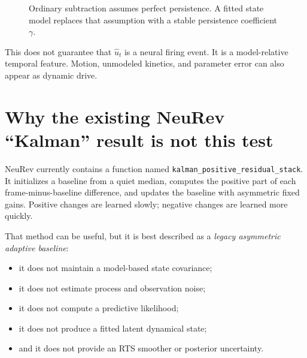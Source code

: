 \documentclass[11pt]{article}
\begin{document}
\begin{figure}[h]
\centering
{}
\caption{Ordinary subtraction assumes perfect persistence. A fitted state model
replaces that assumption with a stable persistence coefficient \(\gamma\).}
\label{fig:gamma-difference}
\end{figure}

This does not guarantee that \(\widehat u_t\) is a neural firing event. It is a
model-relative temporal feature. Motion, unmodeled kinetics, and parameter
error can also appear as dynamic drive.

\section{Why the existing NeuRev ``Kalman'' result is not this test}

NeuRev currently contains a function named
\texttt{kalman\_positive\_residual\_stack}. It initializes a baseline from a
quiet median, computes the positive part of each frame-minus-baseline
difference, and updates the baseline with asymmetric fixed gains. Positive
changes are learned slowly; negative changes are learned more quickly.

That method can be useful, but it is best described as a
\emph{legacy asymmetric adaptive baseline}:

\begin{itemize}[leftmargin=*]
\item it does not maintain a model-based state covariance;
\item it does not estimate process and observation noise;
\item it does not compute a predictive likelihood;
\item it does not produce a fitted latent dynamical state;
\item and it does not provide an RTS smoother or posterior uncertainty.
\end{itemize}
\end{document}
